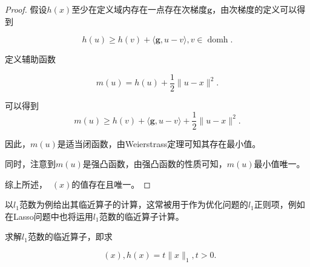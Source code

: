 \begin{proof}
    假设$h(x)$至少在定义域内存在一点存在次梯度$\bm{g}$，由次梯度的定义可以得到

    \begin{equation}
        h(u)\geq h(v)+\langle \bm{g}, u-v\rangle, v\in \mathop{\mathrm{dom}h}.
    \end{equation}

    定义辅助函数

    \begin{equation}
        m(u)=h(u)+\frac{1}{2}\|u-x\|^{2}.
    \end{equation}

    可以得到
    \begin{equation}
        m(u)\geq h(v) + \langle \bm{g}, u-v\rangle + \frac{1}{2}\|u-x\|^{2}.
    \end{equation}

    因此，$m(u)$是适当闭函数，由Weierstrass定理可知其存在最小值。

    同时，注意到$m(u)$是强凸函数，由强凸函数的性质可知，$m(u)$最小值唯一。

    综上所述，$\mathop{\mathrm{prox_{h}}}(x)$的值存在且唯一。
\end{proof}

以$l_{1}$范数为例给出其临近算子的计算，这常被用于作为优化问题的$l_{1}$正则项，例如在Lasso问题中也将运用$l_{1}$范数的临近算子计算。

\begin{problem}\label{exp_prox_1}
    求解$l_{1}$范数的临近算子，即求

    \begin{equation}
        \mathop{\mathrm{prox_{h}}}(x), h(x)=t\|x\|_{1}, t > 0.
    \end{equation}
\end{problem}

